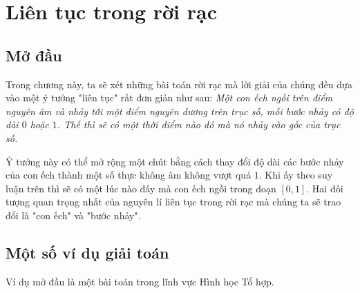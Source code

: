 
	
\section{Liên tục trong rời rạc}
\subsection{Mở đầu}	
\noindent Trong chương này, ta sẽ xét những bài toán rời rạc mà lời giải của chúng đều dựa vào một ý tưởng "liên tục" rất đơn giản như sau: \textit{Một con ếch ngồi trên điểm nguyên âm và nhảy tới một điểm nguyên dương trên trục số, mỗi bước nhảy có độ dài $0$ hoặc $1$. Thế thì sẽ có một thời điểm nào đó mà nó nhảy vào gốc của trục số.}

\noindent Ý tưởng này có thể mở rộng một chút bằng cách thay đổi độ dài các bước nhảy của con ếch thành một số thực không âm không vượt quá $1$. Khi ấy theo suy luận trên thì sẽ có một lúc nào đấy mà con ếch ngồi trong đoạn $[0,1]$. Hai đối tượng quan trọng nhất của nguyên lí liên tục trong rời rạc mà chúng ta sẽ trao đổi là "con ếch" và "bước nhảy".
\subsection{Một số ví dụ giải toán}
\noindent Ví dụ mở đầu là một bài toán trong lĩnh vực Hình học Tổ hợp.

